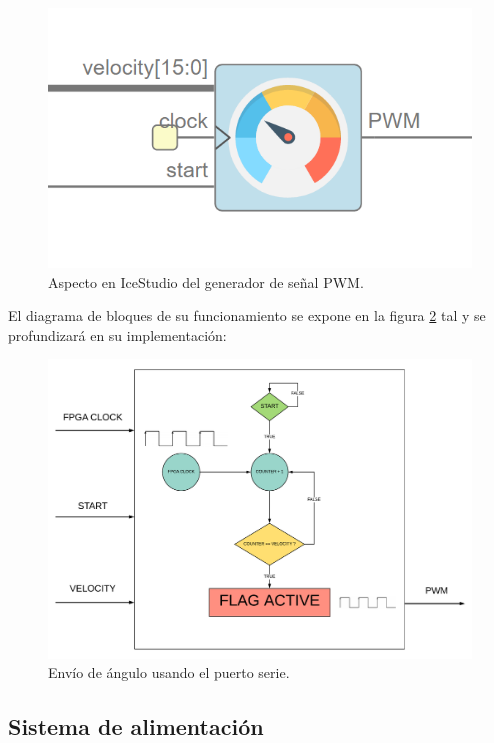 \begin{figure}[H]
	\center
	\includegraphics[scale=0.5]{imagenes/Balancing_robot/PWM_module.PNG}
	\caption{Aspecto en IceStudio del generador de señal PWM.}
	\label{fig:pwm_module}
\end{figure}

El diagrama de bloques de su funcionamiento se expone en la figura \ref{fig:pwm_control} tal y se profundizará en su implementación:

\begin{figure}[H]
	\center
	\includegraphics[trim = 0mm 0mm 0mm 0mm, clip,scale=0.6]{imagenes/Balancing_robot/pwm_control.pdf}
	\caption{Envío de ángulo usando el puerto serie.}
	\label{fig:pwm_control}
\end{figure}

\subsection{Sistema de alimentación}

